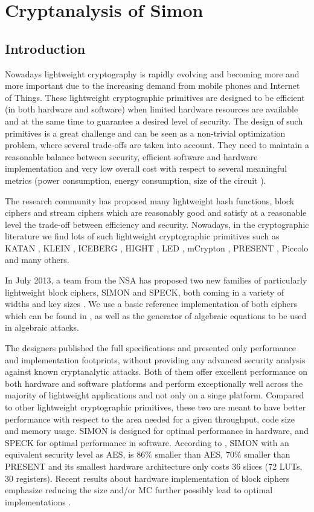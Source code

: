 \chapter{Cryptanalysis of Simon}\label{ch:SIMON}
\section{Introduction}
Nowadays lightweight cryptography is rapidly evolving and becoming more and more important due to the increasing demand from mobile phones and Internet of Things. These lightweight cryptographic primitives are designed to
be efficient (in both hardware and software) when limited
hardware resources are available and at the same time to
guarantee a desired level of security. The
design of such primitives is a great challenge and can be
seen as a non-trivial optimization problem, where several
trade-offs are taken into account. They need to maintain
a reasonable balance between security, efficient software and hardware
implementation and very low overall cost with respect to several
meaningful metrics (power consumption, energy consumption,
size of the circuit \cite{OptimiPaper,BoyarPeraltaMCMethod,BoyarPeraltaMCBoolean}).

The research community has
proposed many lightweight hash functions, block ciphers and stream ciphers which are
reasonably good and satisfy at a reasonable level the trade-off
between efficiency and security. Nowadays, in the cryptographic
literature we find lots of such lightweight cryptographic primitives such as
KATAN \cite{KATAN}, KLEIN \cite{KLEIN}, ICEBERG
\cite{ICEBERG}, HIGHT \cite{HIGHT}, LED \cite{LED},
mCrypton \cite{mCrypton}, PRESENT \cite{PRESENT}, Piccolo \cite{Piccolo}
and many others.

In July 2013, a team from the NSA has proposed two new families of particularly lightweight block
ciphers, SIMON and SPECK, both coming in a variety of widths and key sizes
\cite{NSAciphers}. We use a basic reference implementation of both ciphers
which  can be found in \cite{simonref},
as well as the generator of algebraic equations to be used in algebraic attacks.

The designers published the full specifications and presented
only performance and implementation footprints, without providing
any advanced security analysis
against known cryptanalytic attacks.
Both of them offer excellent performance on both
hardware and software platforms and perform
exceptionally well across the majority of lightweight applications and
not only on a singe platform. Compared to
other lightweight cryptographic primitives,
these two are meant to have better performance with respect to the area
needed for a given throughput, code size and memory usage.
SIMON is designed for optimal performance in hardware, and SPECK for optimal
performance in software.
According to \cite{simoneff}, SIMON with an equivalent security level as AES,
is $86\%$ smaller
than AES, $70\%$ smaller than PRESENT and its smallest hardware architecture
only costs 36 slices (72 LUTs, 30 registers). Recent results about hardware
implementation of block ciphers emphasize reducing the size and/or MC further possibly
lead to optimal implementations \cite{BoyarPeraltaMCMethodAES,OptimiPaper}.

